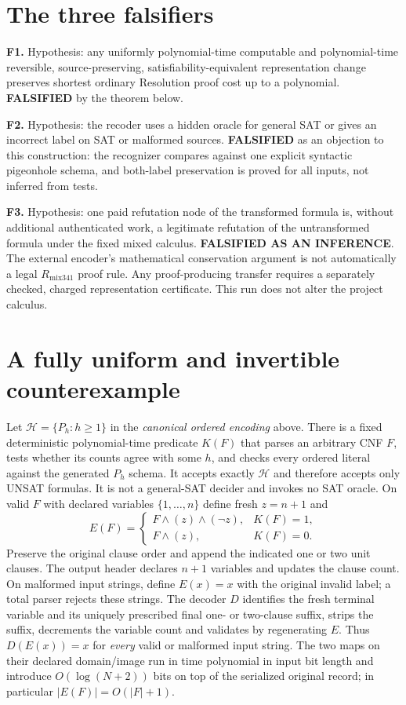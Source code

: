 \documentclass[11pt]{article}
\begin{document}
\section*{The three falsifiers}
\noindent\textbf{F1.} Hypothesis: any uniformly polynomial-time computable and polynomial-time reversible, source-preserving, satisfiability-equivalent representation change preserves shortest ordinary Resolution proof cost up to a polynomial. \textbf{FALSIFIED} by the theorem below.

\noindent\textbf{F2.} Hypothesis: the recoder uses a hidden oracle for general SAT or gives an incorrect label on SAT or malformed sources. \textbf{FALSIFIED} as an objection to this construction: the recognizer compares against one explicit syntactic pigeonhole schema, and both-label preservation is proved for all inputs, not inferred from tests.

\noindent\textbf{F3.} Hypothesis: one paid refutation node of the transformed formula is, without additional authenticated work, a legitimate refutation of the untransformed formula under the fixed mixed calculus. \textbf{FALSIFIED AS AN INFERENCE}. The external encoder's mathematical conservation argument is not automatically a legal $R_{\mathrm{mix341}}$ proof rule. Any proof-producing transfer requires a separately checked, charged representation certificate. This run does not alter the project calculus.

\section*{A fully uniform and invertible counterexample}
Let $\mathcal H=\{P_h:h\ge1\}$ in the \emph{canonical ordered encoding} above. There is a fixed deterministic polynomial-time predicate $K(F)$ that parses an arbitrary CNF $F$, tests whether its counts agree with some $h$, and checks every ordered literal against the generated $P_h$ schema. It accepts exactly $\mathcal H$ and therefore accepts only UNSAT formulas. It is not a general-SAT decider and invokes no SAT oracle. On valid $F$ with declared variables $\{1,\ldots,n\}$ define fresh $z=n+1$ and
\[
 E(F)=\begin{cases}
 F\land(z)\land(\neg z),&K(F)=1,\\
 F\land(z),&K(F)=0.
 \end{cases}
\]
Preserve the original clause order and append the indicated one or two unit clauses. The output header declares $n+1$ variables and updates the clause count. On malformed input strings, define $E(x)=x$ with the original invalid label; a total parser rejects these strings. The decoder $D$ identifies the fresh terminal variable and its uniquely prescribed final one- or two-clause suffix, strips the suffix, decrements the variable count and validates by regenerating $E$. Thus $D(E(x))=x$ for \emph{every} valid or malformed input string. The two maps on their declared domain/image run in time polynomial in input bit length and introduce $O(\log(N+2))$ bits on top of the serialized original record; in particular $|E(F)|=O(|F|+1)$.
\end{document}
